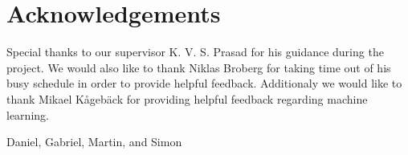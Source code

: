 \thispagestyle{plain}			%
\section*{Acknowledgements}

Special thanks to our supervisor K. V. S. Prasad for his guidance during the project. We would also like to thank Niklas Broberg for taking time out of his busy schedule in order to provide helpful feedback. Additionaly we would like to thank Mikael Kågebäck for providing helpful feedback regarding machine learning.

\vspace{1.5cm}
\hfill
Daniel, Gabriel, Martin, and Simon

\newpage				%
\thispagestyle{empty}
\mbox{}